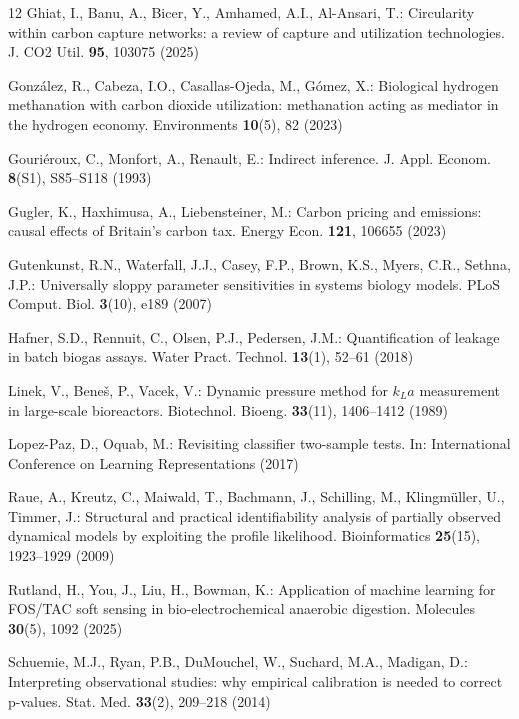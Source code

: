 \documentclass[runningheads]{llncs}
\begin{document}
\begin{thebibliography}{12}
Ghiat, I., Banu, A., Bicer, Y., Amhamed, A.I., Al-Ansari, T.:
Circularity within carbon capture networks: a review of capture and
utilization technologies. J. CO2 Util. \textbf{95}, 103075 (2025)

Gonz\'{a}lez, R., Cabeza, I.O., Casallas-Ojeda, M., G\'{o}mez, X.:
Biological hydrogen methanation with carbon dioxide utilization:
methanation acting as mediator in the hydrogen economy. Environments
\textbf{10}(5), 82 (2023)

Gouri\'{e}roux, C., Monfort, A., Renault, E.: Indirect inference.
J. Appl. Econom. \textbf{8}(S1), S85--S118 (1993)

Gugler, K., Haxhimusa, A., Liebensteiner, M.: Carbon pricing and
emissions: causal effects of Britain's carbon tax. Energy Econ.
\textbf{121}, 106655 (2023)

Gutenkunst, R.N., Waterfall, J.J., Casey, F.P., Brown, K.S., Myers,
C.R., Sethna, J.P.: Universally sloppy parameter sensitivities in
systems biology models. PLoS Comput. Biol. \textbf{3}(10), e189 (2007)

Hafner, S.D., Rennuit, C., Olsen, P.J., Pedersen, J.M.: Quantification
of leakage in batch biogas assays. Water Pract. Technol.
\textbf{13}(1), 52--61 (2018)

Linek, V., Bene\v{s}, P., Vacek, V.: Dynamic pressure method for
$k_{L}a$ measurement in large-scale bioreactors. Biotechnol. Bioeng.
\textbf{33}(11), 1406--1412 (1989)

Lopez-Paz, D., Oquab, M.: Revisiting classifier two-sample tests. In:
International Conference on Learning Representations (2017)

Raue, A., Kreutz, C., Maiwald, T., Bachmann, J., Schilling, M.,
Klingm\"{u}ller, U., Timmer, J.: Structural and practical
identifiability analysis of partially observed dynamical models by
exploiting the profile likelihood. Bioinformatics \textbf{25}(15),
1923--1929 (2009)

Rutland, H., You, J., Liu, H., Bowman, K.: Application of machine learning
for FOS/TAC soft sensing in bio-electrochemical anaerobic digestion.
Molecules \textbf{30}(5), 1092 (2025)

Schuemie, M.J., Ryan, P.B., DuMouchel, W., Suchard, M.A., Madigan, D.:
Interpreting observational studies: why empirical calibration is needed
to correct p-values. Stat. Med. \textbf{33}(2), 209--218 (2014)


\end{thebibliography}
\end{document}
